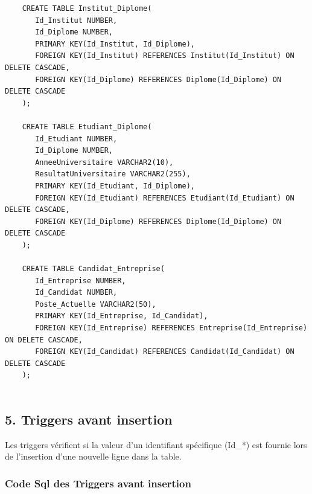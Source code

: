 \documentclass[a4paper,12pt]{article}
\begin{document}
\begin{verbatim}
    CREATE TABLE Institut_Diplome(
       Id_Institut NUMBER,
       Id_Diplome NUMBER,
       PRIMARY KEY(Id_Institut, Id_Diplome),
       FOREIGN KEY(Id_Institut) REFERENCES Institut(Id_Institut) ON DELETE CASCADE,
       FOREIGN KEY(Id_Diplome) REFERENCES Diplome(Id_Diplome) ON DELETE CASCADE
    );
    
    CREATE TABLE Etudiant_Diplome(
       Id_Etudiant NUMBER,
       Id_Diplome NUMBER,
       AnneeUniversitaire VARCHAR2(10),
       ResultatUniversitaire VARCHAR2(255),
       PRIMARY KEY(Id_Etudiant, Id_Diplome),
       FOREIGN KEY(Id_Etudiant) REFERENCES Etudiant(Id_Etudiant) ON DELETE CASCADE,
       FOREIGN KEY(Id_Diplome) REFERENCES Diplome(Id_Diplome) ON DELETE CASCADE
    );
    
    CREATE TABLE Candidat_Entreprise(
       Id_Entreprise NUMBER,
       Id_Candidat NUMBER,
       Poste_Actuelle VARCHAR2(50),
       PRIMARY KEY(Id_Entreprise, Id_Candidat),
       FOREIGN KEY(Id_Entreprise) REFERENCES Entreprise(Id_Entreprise) ON DELETE CASCADE,
       FOREIGN KEY(Id_Candidat) REFERENCES Candidat(Id_Candidat) ON DELETE CASCADE
    );
    
\end{verbatim}
\subsection*{5. Triggers avant insertion}

Les triggers vérifient si la valeur d’un identifiant spécifique (Id_*) est fournie lors de l’insertion d’une nouvelle ligne dans la table.
\subsubsection*{Code Sql des Triggers avant insertion}
\end{document}
